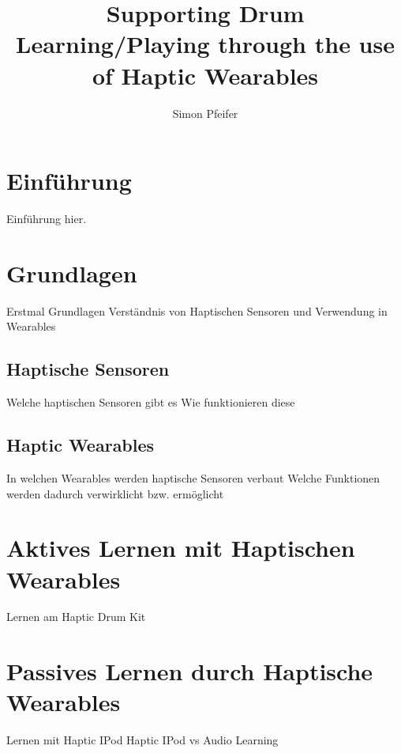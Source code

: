 \documentclass[ngerman,runningheads,a4paper]{llncs}
\begin{document}
\title{Supporting Drum Learning/Playing through the use of Haptic Wearables}
\author{Simon Pfeifer}
\maketitle

\begin{abstract}

\end{abstract}

\begin{keywords}

\end{keywords}

\section{Einführung}
Einführung hier.

\section{Grundlagen}
Erstmal Grundlagen
Verständnis von Haptischen Sensoren
und Verwendung in Wearables

\subsection{Haptische Sensoren}
Welche haptischen Sensoren gibt es
Wie funktionieren diese

\subsection{Haptic Wearables}
In welchen Wearables werden haptische Sensoren verbaut
Welche Funktionen werden dadurch verwirklicht bzw. ermöglicht

\section{Aktives Lernen mit Haptischen Wearables}
Lernen am Haptic Drum Kit
\cite{10.1145/1709886.1709892}

\section{Passives Lernen durch Haptische Wearables}
Lernen mit Haptic IPod
Haptic IPod vs Audio Learning




\end{document}
